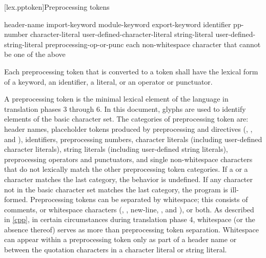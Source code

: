 [lex.pptoken]{Preprocessing tokens}

%
\begin{bnf}
\br
    header-name\br
    import-keyword\br
    module-keyword\br
    export-keyword\br
    identifier\br
    pp-number\br
    character-literal\br
    user-defined-character-literal\br
    string-literal\br
    user-defined-string-literal\br
    preprocessing-op-or-punc\br
    \textnormal{each non-whitespace character that cannot be one of the above}
\end{bnf}

\pnum
Each preprocessing token that is converted to a token
shall have the lexical form of a keyword, an identifier, a literal,
or an operator or punctuator.

\pnum
A preprocessing token is the minimal lexical element of the language in translation
phases 3 through 6.
In this document,
glyphs are used to identify
elements of the basic character set.
The categories of preprocessing token are: header names,
placeholder tokens produced by preprocessing  and  directives
(, , and ),
identifiers, preprocessing numbers, character literals (including user-defined character
literals), string literals (including user-defined string literals), preprocessing
operators and punctuators, and single non-whitespace characters that do not lexically
match the other preprocessing token categories.
If a  or a  character
matches the last category, the behavior is undefined.
If any character not in the basic character set matches the last category,
the program is ill-formed.
Preprocessing tokens can be separated by
%
whitespace;
%
this consists of comments, or whitespace characters
(,
,
new-line,
, and
), or both.
As described in \ref{cpp}, in certain
circumstances during translation phase 4, whitespace (or the absence
thereof) serves as more than preprocessing token separation. Whitespace
can appear within a preprocessing token only as part of a header name or
between the quotation characters in a character literal or
string literal.

